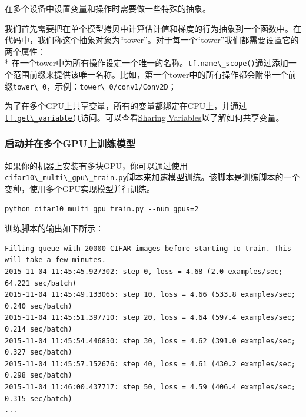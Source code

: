 在多个设备中设置变量和操作时需要做一些特殊的抽象。

我们首先需要把在单个模型拷贝中计算估计值和梯度的行为抽象到一个函数中。在代码中，我们称这个抽象对象为``tower''。对于每一个``tower''我们都需要设置它的两个属性：\\
*
在一个tower中为所有操作设定一个唯一的名称。\href{https://github.com/jikexueyuanwiki/tensorflow-zh/blob/master/SOURCE/api_docs/python/framework.md\#name_scope}{\lstinline{tf.name\_scope()}}通过添加一个范围前缀来提供该唯一名称。比如，第一个tower中的所有操作都会附带一个前缀\lstinline{tower\_0}，示例：\lstinline{tower\_0/conv1/Conv2D}；


为了在多个GPU上共享变量，所有的变量都绑定在CPU上，并通过\href{https://github.com/jikexueyuanwiki/tensorflow-zh/blob/master/SOURCE/api_docs/python/state_ops.md\#get_variable}{\lstinline{tf.get\_variable()}}访问。可以查看\href{https://github.com/jikexueyuanwiki/tensorflow-zh/blob/master/SOURCE/how_tos/variables/index.md}{Sharing
Variables}以了解如何共享变量。

\subsubsection{启动并在多个GPU上训练模型
}\label{ux542fux52a8ux5e76ux5728ux591aux4e2agpuux4e0aux8badux7ec3ux6a21ux578b}

如果你的机器上安装有多块GPU，你可以通过使用\lstinline{cifar10\_multi\_gpu\_train.py}脚本来加速模型训练。该脚本是训练脚本的一个变种，使用多个GPU实现模型并行训练。

\begin{lstlisting}
python cifar10_multi_gpu_train.py --num_gpus=2
\end{lstlisting}

训练脚本的输出如下所示：

\begin{lstlisting}
Filling queue with 20000 CIFAR images before starting to train. This will take a few minutes.
2015-11-04 11:45:45.927302: step 0, loss = 4.68 (2.0 examples/sec; 64.221 sec/batch)
2015-11-04 11:45:49.133065: step 10, loss = 4.66 (533.8 examples/sec; 0.240 sec/batch)
2015-11-04 11:45:51.397710: step 20, loss = 4.64 (597.4 examples/sec; 0.214 sec/batch)
2015-11-04 11:45:54.446850: step 30, loss = 4.62 (391.0 examples/sec; 0.327 sec/batch)
2015-11-04 11:45:57.152676: step 40, loss = 4.61 (430.2 examples/sec; 0.298 sec/batch)
2015-11-04 11:46:00.437717: step 50, loss = 4.59 (406.4 examples/sec; 0.315 sec/batch)
...
\end{lstlisting}


